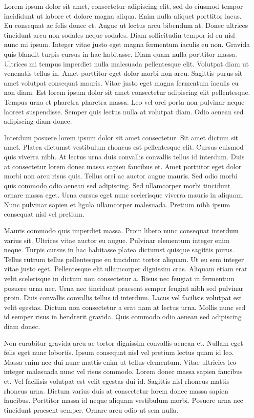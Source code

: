\documentclass[12pt,twocolumn]{article}
\begin{document}
	
	Lorem ipsum dolor sit amet, consectetur adipiscing elit, sed do eiusmod tempor incididunt ut labore et dolore magna aliqua. Enim nulla aliquet porttitor lacus. Eu consequat ac felis donec et. Augue ut lectus arcu bibendum at. Donec ultrices tincidunt arcu non sodales neque sodales. Diam sollicitudin tempor id eu nisl nunc mi ipsum. Integer vitae justo eget magna fermentum iaculis eu non. Gravida quis blandit turpis cursus in hac habitasse. Diam quam nulla porttitor massa. Ultrices mi tempus imperdiet nulla malesuada pellentesque elit. Volutpat diam ut venenatis tellus in. Amet porttitor eget dolor morbi non arcu. Sagittis purus sit amet volutpat consequat mauris. Vitae justo eget magna fermentum iaculis eu non diam. Est lorem ipsum dolor sit amet consectetur adipiscing elit pellentesque. Tempus urna et pharetra pharetra massa. Leo vel orci porta non pulvinar neque laoreet suspendisse. Semper quis lectus nulla at volutpat diam. Odio aenean sed adipiscing diam donec.
	
	Interdum posuere lorem ipsum dolor sit amet consectetur. Sit amet dictum sit amet. Platea dictumst vestibulum rhoncus est pellentesque elit. Cursus euismod quis viverra nibh. At lectus urna duis convallis convallis tellus id interdum. Duis at consectetur lorem donec massa sapien faucibus et. Amet porttitor eget dolor morbi non arcu risus quis. Tellus orci ac auctor augue mauris. Sed odio morbi quis commodo odio aenean sed adipiscing. Sed ullamcorper morbi tincidunt ornare massa eget. Urna cursus eget nunc scelerisque viverra mauris in aliquam. Nunc pulvinar sapien et ligula ullamcorper malesuada. Pretium nibh ipsum consequat nisl vel pretium.
	
	Mauris commodo quis imperdiet massa. Proin libero nunc consequat interdum varius sit. Ultrices vitae auctor eu augue. Pulvinar elementum integer enim neque. Turpis cursus in hac habitasse platea dictumst quisque sagittis purus. Tellus rutrum tellus pellentesque eu tincidunt tortor aliquam. Ut eu sem integer vitae justo eget. Pellentesque elit ullamcorper dignissim cras. Aliquam etiam erat velit scelerisque in dictum non consectetur a. Risus nec feugiat in fermentum posuere urna nec. Urna nec tincidunt praesent semper feugiat nibh sed pulvinar proin. Duis convallis convallis tellus id interdum. Lacus vel facilisis volutpat est velit egestas. Dictum non consectetur a erat nam at lectus urna. Mollis nunc sed id semper risus in hendrerit gravida. Quis commodo odio aenean sed adipiscing diam donec.
	
	Non curabitur gravida arcu ac tortor dignissim convallis aenean et. Nullam eget felis eget nunc lobortis. Ipsum consequat nisl vel pretium lectus quam id leo. Massa enim nec dui nunc mattis enim ut tellus elementum. Vitae ultricies leo integer malesuada nunc vel risus commodo. Lorem donec massa sapien faucibus et. Vel facilisis volutpat est velit egestas dui id. Sagittis nisl rhoncus mattis rhoncus urna. Dictum varius duis at consectetur lorem donec massa sapien faucibus. Porttitor massa id neque aliquam vestibulum morbi. Posuere urna nec tincidunt praesent semper. Ornare arcu odio ut sem nulla.
	
\end{document}
